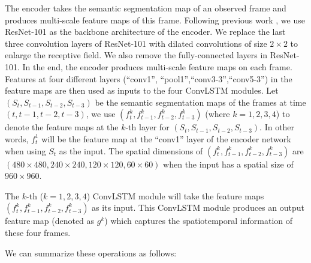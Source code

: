 \documentclass{bmvc2k}
\begin{document}
The encoder takes the semantic segmentation map of an observed frame and produces multi-scale feature maps of this frame. Following previous work \cite{jin2017predicting}, we use ResNet-101 \cite{he2016deep} as the backbone architecture of the encoder. We replace the last three convolution layers of ResNet-101 with dilated convolutions of size $2\times 2$ to enlarge the receptive field. We also remove the fully-connected layers in ResNet-101. In the end, the encoder produces multi-scale feature maps on each frame. Features at four different layers (``conv1'', ``pool1'',``conv3-3'',``conv5-3'') in the feature maps are then used as inputs to the four ConvLSTM modules. Let $(S_{t},S_{t-1},S_{t-2}, S_{t-3})$ be the semantic segmentation maps of the frames at time $(t, t-1, t-2, t-3)$, we use $(f_{t}^k, f_{t-1}^k, f_{t-2}^k, f_{t-3}^k)$ (where $k=1,2,3,4$) to denote the feature maps at the $k$-th layer for $(S_{t}, S_{t-1}, S_{t-2}, S_{t-3})$. In other words, $f_{t}^1$ will be the feature map at the ``conv1'' layer of the encoder network when using $S_{t}$ as the input. The spatial dimensions of $(f_{t}^k, f_{t-1}^k, f_{t-2}^k, f_{t-3}^k)$ are $(480\times480, 240\times240, 120\times120, 60\times60)$ when the input has a spatial size of $960\times 960$.

The $k$-th ($k=1,2,3,4$) ConvLSTM module will take the feature maps $(f_{t}^k,f_{t-1}^k,f_{t-2}^k,f_{t-3}^k)$ as its input. This ConvLSTM module produces an output feature map (denoted as $g^{k}$) which captures the spatiotemporal information of these four frames. 

We can summarize these operations as follows: 
\end{document}
